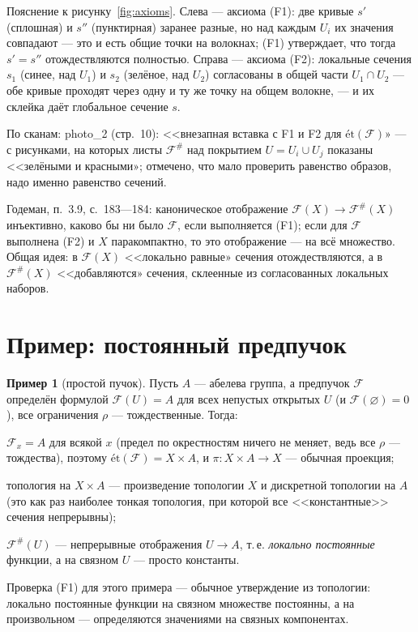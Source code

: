 \documentclass[11pt,b5paper]{article}
\newcommand{\et}{\text{ét}}
\newcommand{\Shv}[1]{\mathscr{#1}}   %
\theoremstyle{plain}
\theoremstyle{definition}
\newtheorem{exminner}[thminner]{Пример}
\theoremstyle{remark}
\newcommand{\thmbeg}{%
  \par\smallskip
  \begin{lrbox}{\thmbox}%
  \begin{minipage}{\linewidth}}
\newcommand{\thmend}{%
  \end{minipage}%
  \end{lrbox}%
  \noindent\usebox{\thmbox}%
  \par\smallskip}
\newenvironment{exm}{\thmbeg\begin{exminner}}{\end{exminner}\thmend}
\newenvironment{bookbox}{\par\smallskip\begingroup\color{gray}\noindent
  \ignorespaces}{\par\endgroup\smallskip}
\newcommand{\booksrc}[1]{%
  \noindent{\bfseries\small Дополнение из книги:}\par\smallskip
  \noindent#1\par\smallskip}
\newcommand{\sectionsrc}[1]{\par\smallskip\noindent
  {\color{gray}\footnotesize По сканам: #1}\par\medskip}
\let\brutsection\section
\renewcommand{\section}{\Needspace{7\baselineskip}\brutsection}
\begin{document}
Пояснение к рисунку~\ref{fig:axioms}. Слева --- аксиома (F1):
две кривые $s'$ (сплошная) и $s''$ (пунктирная) заранее разные,
но над каждым $U_i$ их значения совпадают --- это и есть общие
точки на волокнах; (F1) утверждает, что тогда $s'=s''$
отождествляются полностью. Справа --- аксиома (F2): локальные
сечения $s_1$ (синее, над $U_1$) и $s_2$ (зелёное, над $U_2$)
согласованы в общей части $U_1\cap U_2$ --- обе кривые проходят
через одну и ту же точку на общем волокне, --- и их склейка
даёт глобальное сечение $s$.

\sectionsrc{photo\_2 (стр.~10): <<внезапная вставка с F1 и F2
 для $\et(\Shv{F})$» --- с рисунками, на которых листы $\Shv{F}^{\#}$
 над покрытием $U=U_i\cup U_j$ показаны <<зелёными и красными»;
 отмечено, что мало проверить равенство образов, надо именно равенство
 сечений.}

\begin{bookbox}
\booksrc{Годеман, п.~3.9, с.~183---184: каноническое отображение
 $\Shv{F}(X)\to\Shv{F}^{\#}(X)$ инъективно, каково бы ни было
 $\Shv{F}$, если выполняется (F1); если для $\Shv{F}$ выполнена (F2)
 и $X$ паракомпактно, то это отображение --- на всё множество.
 Общая идея: в $\Shv{F}(X)$ <<локально равные» сечения отождествляются,
 а в $\Shv{F}^{\#}(X)$ <<добавляются» сечения, склеенные из
 согласованных локальных наборов.
}
\end{bookbox}

\section{Пример: постоянный предпучок}\label{sec:const}

\begin{exm}[простой пучок]\label{exm:const}
Пусть $A$ --- абелева группа, а предпучок $\Shv{F}$ определён формулой
$\Shv{F}(U)=A$ для всех непустых открытых $U$ (и
$\Shv{F}(\varnothing)=0$), все ограничения $\rho$ --- тождественные.
Тогда:
\begin{bullets}
\item $\Shv{F}_x=A$ для всякой $x$ (предел по окрестностям ничего не
 меняет, ведь все $\rho$ --- тождества), поэтому
 $\et(\Shv{F})=X\times A$, и $\pi\colon X\times A\to X$ --- обычная
 проекция;
\item топология на $X\times A$ --- произведение топологии $X$ и
  дискретной топологии на $A$ (это как раз наиболее тонкая топология,
 при которой все <<константные>> сечения непрерывны);
\item $\Shv{F}^{\#}(U)$ --- непрерывные отображения $U\to A$, т.\,е.
 \emph{локально постоянные} функции, а на связном $U$ --- просто
 константы.
\end{bullets}
Проверка (F1) для этого примера --- обычное утверждение из топологии:
локально постоянные функции на связном множестве постоянны, а на
произвольном --- определяются значениями на связных компонентах.
\end{exm}
\end{document}
